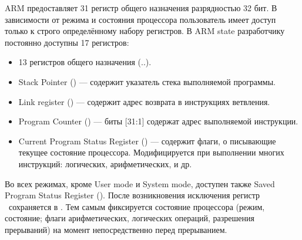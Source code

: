 ARM предоставляет 31 регистр общего назначения разрядностью 32 бит. 
В зависимости от режима и состояния процессора пользователь имеет доступ 
только к строго определённому набору регистров. В ARM state разработчику 
постоянно доступны 17 регистров:

\begin{itemize}
\item 13 регистров общего назначения (..).
\item Stack Pointer () — содержит указатель стека выполняемой программы.
\item Link register () — содержит адрес возврата в инструкциях ветвления.
\item Program Counter () — биты [31:1] содержат адрес выполняемой инструкции.
\item Current Program Status Register () — содержит флаги, о
писывающие текущее состояние процессора. Модифицируется при выполнении 
многих инструкций: логических, арифметических, и др.
\end{itemize}

Во всех режимах, кроме User mode и System mode, доступен также Saved 
Program Status Register (). После возникновения исключения регистр 
\ сохраняется в . Тем самым фиксируется состояние процессора (режим, 
состояние; флаги арифметических, логических операций, разрешения прерываний) 
на момент непосредственно перед прерыванием.
